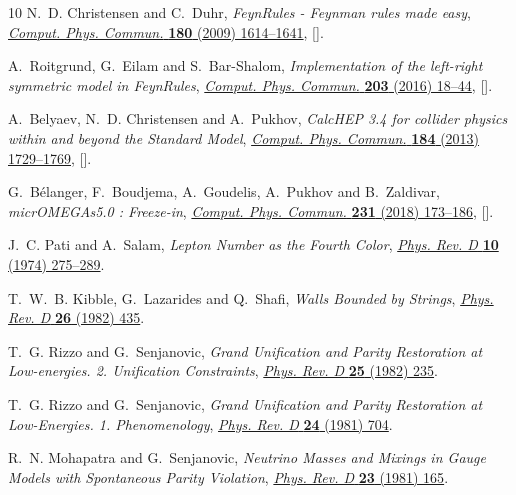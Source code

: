 \documentclass[11pt]{article}
\begin{document}
\begin{thebibliography}{10}
N.~D. Christensen and C.~Duhr, \emph{{FeynRules - Feynman rules made easy}},
  \href{https://doi.org/10.1016/j.cpc.2009.02.018}{\emph{Comput. Phys. Commun.}
  {\bfseries 180} (2009) 1614--1641},
  [\href{https://arxiv.org/abs/0806.4194}{{}}].

A.~Roitgrund, G.~Eilam and S.~Bar-Shalom, \emph{{Implementation of the
  left-right symmetric model in FeynRules}},
  \href{https://doi.org/10.1016/j.cpc.2015.12.009}{\emph{Comput. Phys. Commun.}
  {\bfseries 203} (2016) 18--44},
  [\href{https://arxiv.org/abs/1401.3345}{{}}].

A.~Belyaev, N.~D. Christensen and A.~Pukhov, \emph{{CalcHEP 3.4 for collider
  physics within and beyond the Standard Model}},
  \href{https://doi.org/10.1016/j.cpc.2013.01.014}{\emph{Comput. Phys. Commun.}
  {\bfseries 184} (2013) 1729--1769},
  [\href{https://arxiv.org/abs/1207.6082}{{}}].

G.~B\'elanger, F.~Boudjema, A.~Goudelis, A.~Pukhov and B.~Zaldivar,
  \emph{{micrOMEGAs5.0 : Freeze-in}},
  \href{https://doi.org/10.1016/j.cpc.2018.04.027}{\emph{Comput. Phys. Commun.}
  {\bfseries 231} (2018) 173--186},
  [\href{https://arxiv.org/abs/1801.03509}{{}}].

J.~C. Pati and A.~Salam, \emph{{Lepton Number as the Fourth Color}},
  \href{https://doi.org/10.1103/PhysRevD.10.275}{\emph{Phys. Rev. D} {\bfseries
  10} (1974) 275--289}.

T.~W.~B. Kibble, G.~Lazarides and Q.~Shafi, \emph{{Walls Bounded by Strings}},
  \href{https://doi.org/10.1103/PhysRevD.26.435}{\emph{Phys. Rev. D} {\bfseries
  26} (1982) 435}.

T.~G. Rizzo and G.~Senjanovic, \emph{{Grand Unification and Parity Restoration
  at Low-energies. 2. Unification Constraints}},
  \href{https://doi.org/10.1103/PhysRevD.25.235}{\emph{Phys. Rev. D} {\bfseries
  25} (1982) 235}.

T.~G. Rizzo and G.~Senjanovic, \emph{{Grand Unification and Parity Restoration
  at Low-Energies. 1. Phenomenology}},
  \href{https://doi.org/10.1103/PhysRevD.25.1447}{\emph{Phys. Rev. D}
  {\bfseries 24} (1981) 704}.

R.~N. Mohapatra and G.~Senjanovic, \emph{{Neutrino Masses and Mixings in Gauge
  Models with Spontaneous Parity Violation}},
  \href{https://doi.org/10.1103/PhysRevD.23.165}{\emph{Phys. Rev. D} {\bfseries
  23} (1981) 165}.


\end{thebibliography}
\end{document}
